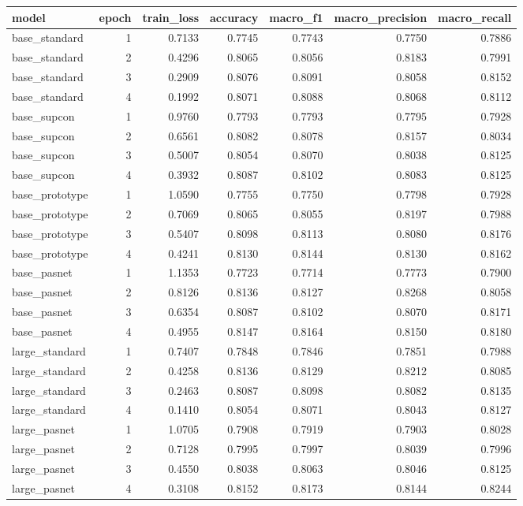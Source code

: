 \begin{tabular}{lrrrrrr}
\toprule
model & epoch & train\_loss & accuracy & macro\_f1 & macro\_precision & macro\_recall \\
\midrule
base\_standard & 1 & 0.7133 & 0.7745 & 0.7743 & 0.7750 & 0.7886 \\
base\_standard & 2 & 0.4296 & 0.8065 & 0.8056 & 0.8183 & 0.7991 \\
base\_standard & 3 & 0.2909 & 0.8076 & 0.8091 & 0.8058 & 0.8152 \\
base\_standard & 4 & 0.1992 & 0.8071 & 0.8088 & 0.8068 & 0.8112 \\
base\_supcon & 1 & 0.9760 & 0.7793 & 0.7793 & 0.7795 & 0.7928 \\
base\_supcon & 2 & 0.6561 & 0.8082 & 0.8078 & 0.8157 & 0.8034 \\
base\_supcon & 3 & 0.5007 & 0.8054 & 0.8070 & 0.8038 & 0.8125 \\
base\_supcon & 4 & 0.3932 & 0.8087 & 0.8102 & 0.8083 & 0.8125 \\
base\_prototype & 1 & 1.0590 & 0.7755 & 0.7750 & 0.7798 & 0.7928 \\
base\_prototype & 2 & 0.7069 & 0.8065 & 0.8055 & 0.8197 & 0.7988 \\
base\_prototype & 3 & 0.5407 & 0.8098 & 0.8113 & 0.8080 & 0.8176 \\
base\_prototype & 4 & 0.4241 & 0.8130 & 0.8144 & 0.8130 & 0.8162 \\
base\_pasnet & 1 & 1.1353 & 0.7723 & 0.7714 & 0.7773 & 0.7900 \\
base\_pasnet & 2 & 0.8126 & 0.8136 & 0.8127 & 0.8268 & 0.8058 \\
base\_pasnet & 3 & 0.6354 & 0.8087 & 0.8102 & 0.8070 & 0.8171 \\
base\_pasnet & 4 & 0.4955 & 0.8147 & 0.8164 & 0.8150 & 0.8180 \\
large\_standard & 1 & 0.7407 & 0.7848 & 0.7846 & 0.7851 & 0.7988 \\
large\_standard & 2 & 0.4258 & 0.8136 & 0.8129 & 0.8212 & 0.8085 \\
large\_standard & 3 & 0.2463 & 0.8087 & 0.8098 & 0.8082 & 0.8135 \\
large\_standard & 4 & 0.1410 & 0.8054 & 0.8071 & 0.8043 & 0.8127 \\
large\_pasnet & 1 & 1.0705 & 0.7908 & 0.7919 & 0.7903 & 0.8028 \\
large\_pasnet & 2 & 0.7128 & 0.7995 & 0.7997 & 0.8039 & 0.7996 \\
large\_pasnet & 3 & 0.4550 & 0.8038 & 0.8063 & 0.8046 & 0.8125 \\
large\_pasnet & 4 & 0.3108 & 0.8152 & 0.8173 & 0.8144 & 0.8244 \\
\bottomrule
\end{tabular}
